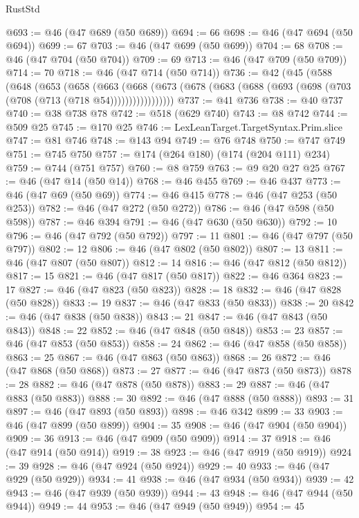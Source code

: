 \begin{lexlean}{RustStd}
\begin{coremodule}
@693 := @46 (@47 @689 (@50 @689))
@694 := 66
@698 := @46 (@47 @694 (@50 @694))
@699 := 67
@703 := @46 (@47 @699 (@50 @699))
@704 := 68
@708 := @46 (@47 @704 (@50 @704))
@709 := 69
@713 := @46 (@47 @709 (@50 @709))
@714 := 70
@718 := @46 (@47 @714 (@50 @714))
@736 := @42
    (@45
      (@588
        (@648
          (@653
            (@658
              (@663
                (@668
                  (@673 (@678 (@683 (@688 (@693 (@698 (@703 (@708 (@713 (@718 @54)))))))))))))))))
@737 := @41 @736
@738 := @40 @737
@740 := @38 @738 @78
@742 := @518 (@629 @740)
@743 := @8 @742
@744 := @509 @25
@745 := @170 @25
@746 := LexLeanTarget.TargetSyntax.Prim.slice
@747 := @81 @746
@748 := @143 @94
@749 := @76 @748
@750 := @747 @749
@751 := @745 @750
@757 := @174 (@264 @180) (@174 (@204 @111) @234)
@759 := @744 (@751 @757)
@760 := @8 @759
@763 := @9 @20 @27 @25
@767 := @46 (@47 @14 (@50 @14))
@768 := @46 @455
@769 := @46 @437
@773 := @46 (@47 @69 (@50 @69))
@774 := @46 @415
@778 := @46 (@47 @253 (@50 @253))
@782 := @46 (@47 @272 (@50 @272))
@786 := @46 (@47 @598 (@50 @598))
@787 := @46 @394
@791 := @46 (@47 @630 (@50 @630))
@792 := 10
@796 := @46 (@47 @792 (@50 @792))
@797 := 11
@801 := @46 (@47 @797 (@50 @797))
@802 := 12
@806 := @46 (@47 @802 (@50 @802))
@807 := 13
@811 := @46 (@47 @807 (@50 @807))
@812 := 14
@816 := @46 (@47 @812 (@50 @812))
@817 := 15
@821 := @46 (@47 @817 (@50 @817))
@822 := @46 @364
@823 := 17
@827 := @46 (@47 @823 (@50 @823))
@828 := 18
@832 := @46 (@47 @828 (@50 @828))
@833 := 19
@837 := @46 (@47 @833 (@50 @833))
@838 := 20
@842 := @46 (@47 @838 (@50 @838))
@843 := 21
@847 := @46 (@47 @843 (@50 @843))
@848 := 22
@852 := @46 (@47 @848 (@50 @848))
@853 := 23
@857 := @46 (@47 @853 (@50 @853))
@858 := 24
@862 := @46 (@47 @858 (@50 @858))
@863 := 25
@867 := @46 (@47 @863 (@50 @863))
@868 := 26
@872 := @46 (@47 @868 (@50 @868))
@873 := 27
@877 := @46 (@47 @873 (@50 @873))
@878 := 28
@882 := @46 (@47 @878 (@50 @878))
@883 := 29
@887 := @46 (@47 @883 (@50 @883))
@888 := 30
@892 := @46 (@47 @888 (@50 @888))
@893 := 31
@897 := @46 (@47 @893 (@50 @893))
@898 := @46 @342
@899 := 33
@903 := @46 (@47 @899 (@50 @899))
@904 := 35
@908 := @46 (@47 @904 (@50 @904))
@909 := 36
@913 := @46 (@47 @909 (@50 @909))
@914 := 37
@918 := @46 (@47 @914 (@50 @914))
@919 := 38
@923 := @46 (@47 @919 (@50 @919))
@924 := 39
@928 := @46 (@47 @924 (@50 @924))
@929 := 40
@933 := @46 (@47 @929 (@50 @929))
@934 := 41
@938 := @46 (@47 @934 (@50 @934))
@939 := 42
@943 := @46 (@47 @939 (@50 @939))
@944 := 43
@948 := @46 (@47 @944 (@50 @944))
@949 := 44
@953 := @46 (@47 @949 (@50 @949))
@954 := 45

\end{coremodule}
\end{lexlean}
